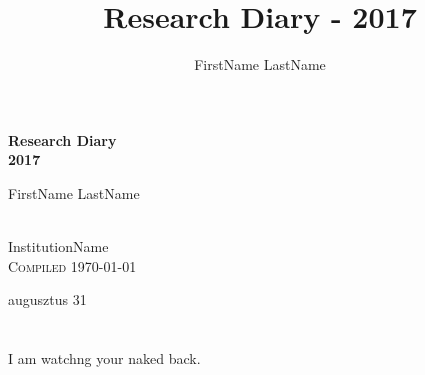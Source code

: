 \documentclass[letterpaper,11pt]{article}
\title{Research Diary - 2017}
\author{FirstName LastName}
\begin{document}
\begin{center} \begin{LARGE}
\textbf{Research Diary} \\[3mm]
\textbf{2017} \\[2cm]
\end{LARGE} \begin{large}
FirstName LastName \end{large} \\
InstitutionName \\[7in]
\textsc{Compiled \today}
\end{center}
\thispagestyle{empty}
\newpage



\logoPNG

{\Huge augusztus 31}

\section*{ }


I am watchng your naked back.





\newpage
\end{document}
